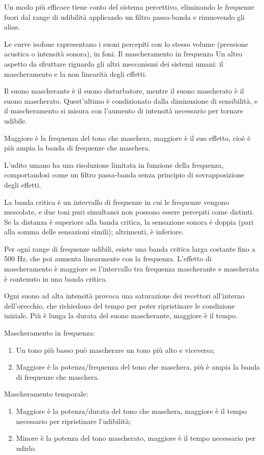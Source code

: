 Un modo più efficace tiene conto del sistema percettivo, eliminando le frequenze fuori dal range di udibilità applicando un filtro passa-banda e rimuovendo gli alias. 

Le curve isofone rapresentano i suoni percepiti con lo stesso volume (pressione acustica o intensità sonora), in foni. Il mascheramento in frequenza 
Un altro aspetto da sfruttare riguarda gli altri meccanismi dei sistemi umani: il mascheramento e la non linearità degli effetti. 
 
Il suono mascherante è il suono disturbatore, mentre il suono mascherato è il suono mascherato. Quest'ultimo è condizionato dalla diminuzione di sensibilità, e il mascheramento si misura con l'aumento di intensità necessario per tornare udibile.
 
Maggiore è la frequenza del tono che maschera, maggiore è il suo effetto, cioè è più ampia la banda di frequenze che maschera.
 
L'udito umano ha una risoluzione limitata in funzione della frequenza, comportandosi come un filtro passa-banda senza principio di sovrapposizione degli effetti.
 
La banda critica è un intervallo di frequenze in cui le frequenze vengono mescolate, e due toni puri simultanei non possono essere percepiti come distinti. Se la distanza è superiore alla banda critica, la sensazione sonora è doppia (pari alla somma delle sensazioni simili); altrimenti, è inferiore.

Per ogni range di frequenze udibili, esiste una banda critica larga costante fino a 500 Hz, che poi aumenta linearmente con la frequenza. L'effetto di mascheramento è maggiore se l'intervallo tra frequenza mascherante e mascherata è contenuto in una banda critica.

Ogni suono ad alta intensità provoca una saturazione dei recettori all'interno dell'orecchio, che richiedono del tempo per poter ripristinare le condizione iniziale. Più è lunga la durata del suono mascherante, maggiore è il tempo.

Mascheramento in frequenza:
\begin{enumerate}
	\item Un tono più basso può mascherare un tono più alto e viceversa;
	\item Maggiore è la potenza/frequenza del tono che maschera, più è ampia la banda di frequenze che maschera.
\end{enumerate}

Mascheramento temporale:
\begin{enumerate}
	\item Maggiore è la potenza/durata del tono che maschera, maggiore è il tempo necessario per ripristinare l'udibilità;
	\item Minore è la potenza del tono mascherato, maggiore è il tempo necessario per udirlo.
\end{enumerate}


